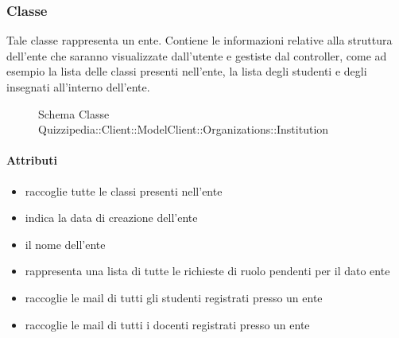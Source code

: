 \subsubsection{Classe }
Tale classe rappresenta un ente. Contiene le informazioni relative alla struttura dell'ente che saranno visualizzate dall'utente e gestiste dal controller, come ad esempio la lista delle classi presenti nell'ente, la lista degli studenti e degli insegnati all'interno dell'ente.
\begin{figure}[H]
\centering
\noindent{}
\caption[Schema Classe Institution]{Schema Classe Quizzipedia::Client::ModelClient::Organizations::Institution}
\end{figure}
\paragraph{Attributi}
\begin{itemize}
\item {}
\newline
raccoglie tutte le classi presenti nell'ente
\item {}
\newline
indica la data di creazione dell'ente
\item {}
\newline
il nome dell'ente
\item {}
\newline
rappresenta una lista di tutte le richieste di ruolo pendenti per il dato ente
\item {}
\newline
raccoglie le mail di tutti gli studenti registrati presso un ente
\item {}
\newline
raccoglie le mail di tutti i docenti registrati presso un ente
\end{itemize}

